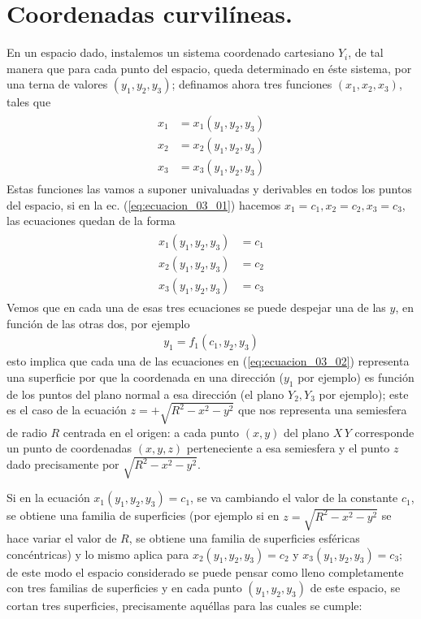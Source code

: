 \section{Coordenadas curvilíneas.}
En un espacio dado, instalemos un sistema coordenado cartesiano $Y_{i}$, de tal manera que para cada punto del espacio, queda determinado en éste sistema, por una terna de valores $(y_{1}, y_{2}, y_{3})$; definamos ahora tres funciones $(x_{1}, x_{2}, x_{3})$, tales que
\begin{align}
\begin{aligned}
x_{1} &= x_{1} (y_{1}, y_{2}, y_{3}) \\
x_{2} &= x_{2} (y_{1}, y_{2}, y_{3}) \\
x_{3} &= x_{3} (y_{1}, y_{2}, y_{3})
\end{aligned}
\label{eq:ecuacion_03_01}
\end{align}
Estas funciones las vamos a suponer univaluadas y derivables en todos los puntos del espacio, si en la ec. (\ref{eq:ecuacion_03_01}) hacemos $x_{1} = c_{1}, x_{2} = c_{2}, x_{3} =c_{3}$, las ecuaciones quedan de la forma
\begin{align}
\begin{aligned}
x_{1} (y_{1}, y_{2}, y_{3}) &= c_{1} \\
x_{2} (y_{1}, y_{2}, y_{3}) &= c_{2} \\
x_{3} (y_{1}, y_{2}, y_{3}) &= c_{3}
\end{aligned}
\label{eq:ecuacion_03_02}
\end{align}
Vemos que en cada una de esas tres ecuaciones se puede despejar una de las $y$, en función de las otras dos, por ejemplo
\begin{align*}
y_{1} = f_{1} (c_{1}, y_{2}, y_{3})
\end{align*}
esto implica que cada una de las ecuaciones en (\ref{eq:ecuacion_03_02}) representa una superficie por que la coordenada en una dirección ($y_{1}$ por ejemplo) es función de los puntos del plano normal a esa dirección (el plano $Y_{2}, Y_{3}$ por ejemplo); este es el caso de la ecuación $z = +\sqrt{R^{2} - x^{2} - y^{2}}$ que nos representa una semiesfera de radio $R$ centrada en el origen: a cada punto $(x, y)$ del plano $X \, Y$ corresponde un punto de coordenadas $(x, y , z)$ perteneciente a esa semiesfera y el punto $z$ dado precisamente por $\sqrt{R^{2} - x^{2} - y^{2}}$.
\par
Si en la ecuación $x_{1} (y_{1}, y_{2}, y_{3}) = c_{1}$, se va cambiando el valor de la constante $c_{1}$, se obtiene una familia de superficies (por ejemplo si en $z = \sqrt{R^{2} - x^{2} - y^{2}}$ se hace variar el valor de $R$, se obtiene una familia de superficies esféricas concéntricas) y lo mismo aplica para $x_{2} (y_{1}, y_{2}, y_{3}) = c_{2}$ y $x_{3} (y_{1}, y_{2}, y_{3}) = c_{3}$; de este modo el espacio considerado se puede pensar como lleno completamente con tres familias de superficies y en cada punto $(y_{1}, y_{2}, y_{3})$ de este espacio, se cortan tres superficies, precisamente aquéllas para las cuales se cumple:

